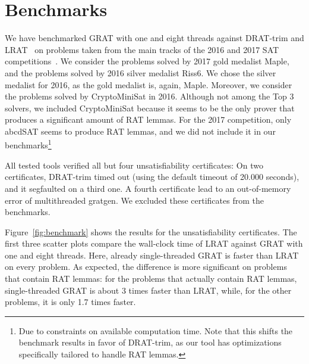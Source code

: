 \documentclass[smallcondensed]{svjour3}     %
\begin{document}
\section{Benchmarks}\label{sec:benchmarks}
  We have benchmarked GRAT with one and eight threads against DRAT-trim and LRAT~\cite{HHKW17} on problems taken from the main tracks of the 2016 and 2017 SAT 
  competitions~\cite{satcomp-2016,satcomp-2017}. We consider the problems solved by 2017 gold medalist Maple, and the problems solved by 2016 silver medalist Riss6.
  We chose the silver medalist for 2016, as the gold medalist is, again, Maple.
  Moreover, we consider the problems solved by CryptoMiniSat in 2016. Although not among the Top 3 solvers, we included CryptoMiniSat because it seems to be 
  the only prover that produces a significant amount of RAT lemmas. For the 2017 competition, only abcdSAT seems to produce RAT lemmas, and we did not include 
  it in our benchmarks\footnote{Due to constraints on available computation time. Note that this shifts the benchmark results in favor of DRAT-trim, 
    as our tool has optimizations specifically tailored to handle RAT lemmas.}
    
  All tested tools verified all but four unsatisfiability certificates: On two certificates, DRAT-trim timed out (using the default timeout of 20.000 seconds), 
  and it segfaulted on a third one. A fourth certificate lead to an out-of-memory error of multithreaded gratgen. We excluded these certificates 
  from the benchmarks.
    
  Figure~\ref{fig:benchmark} shows the results for the unsatisfiability certificates. The first three scatter plots compare the 
  wall-clock time of LRAT against GRAT with one and eight threads. Here, already single-threaded GRAT is faster than LRAT on every problem.
  As expected, the difference is more significant on problems that contain RAT lemmas: for the problems that actually contain RAT 
  lemmas, single-threaded GRAT is about 3 times faster than LRAT, while, for the other problems, it is only 1.7 times faster.
  
\end{document}
